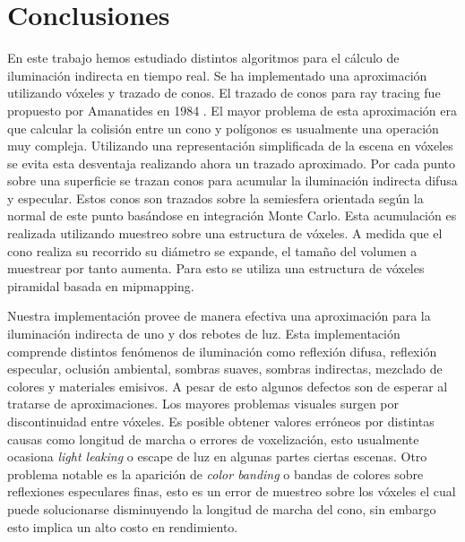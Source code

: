 \chapter{Conclusiones}
\label{chap:conclusion}
En este trabajo hemos estudiado distintos algoritmos para el cálculo de iluminación indirecta en tiempo real. Se ha implementado una aproximación utilizando vóxeles y trazado de conos. El trazado de conos para ray tracing fue propuesto por Amanatides en 1984 \cite{Amanatides:1984:RTC:800031.808589}. El mayor problema de esta aproximación era que calcular la colisión entre un cono y polígonos es usualmente una operación muy compleja. Utilizando una representación simplificada de la escena en vóxeles se evita esta desventaja realizando ahora un trazado aproximado. Por cada punto sobre una superficie se trazan conos para acumular la iluminación indirecta difusa y especular. Estos conos son trazados sobre la semiesfera orientada según la normal de este punto basándose en integración Monte Carlo. Esta acumulación es realizada utilizando muestreo sobre una estructura de vóxeles. A medida que el cono realiza su recorrido su diámetro se expande, el tamaño del volumen a muestrear por tanto aumenta. Para esto se utiliza una estructura de vóxeles piramidal basada en mipmapping.

Nuestra implementación provee de manera efectiva una aproximación para la iluminación indirecta de uno y dos rebotes de luz. Esta implementación comprende distintos fenómenos de iluminación como reflexión difusa, reflexión especular, oclusión ambiental, sombras suaves, sombras indirectas, mezclado de colores y materiales emisivos. A pesar de esto algunos defectos son de esperar al tratarse de aproximaciones. Los mayores problemas visuales surgen por discontinuidad entre vóxeles. Es posible obtener valores erróneos por distintas causas como longitud de marcha o errores de voxelización, esto usualmente ocasiona \emph{light leaking} o escape de luz en algunas partes ciertas escenas. Otro problema notable es la aparición de \emph{color banding} o bandas de colores sobre reflexiones especulares finas, esto es un error de muestreo sobre los vóxeles el cual puede solucionarse disminuyendo la longitud de marcha del cono, sin embargo esto implica un alto costo en rendimiento.


